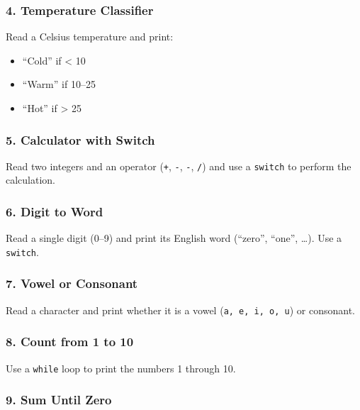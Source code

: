 \documentclass[
  letterpaper,
  DIV=11,
  numbers=noendperiod]{scrreprt}
\providecommand{\tightlist}{%
  \setlength{\itemsep}{0pt}\setlength{\parskip}{0pt}}
\begin{document}
\subsubsection{4. Temperature Classifier}\label{temperature-classifier}

Read a Celsius temperature and print:

\begin{itemize}
\tightlist
\item
  ``Cold'' if \textless{} 10
\item
  ``Warm'' if 10--25
\item
  ``Hot'' if \textgreater{} 25
\end{itemize}

\subsubsection{5. Calculator with Switch}\label{calculator-with-switch}

Read two integers and an operator (\texttt{+}, \texttt{-}, \texttt{-},
\texttt{/}) and use a \texttt{switch} to perform the calculation.

\subsubsection{6. Digit to Word}\label{digit-to-word}

Read a single digit (0--9) and print its English word (``zero'',
``one'', \ldots). Use a \texttt{switch}.

\subsubsection{7. Vowel or Consonant}\label{vowel-or-consonant}

Read a character and print whether it is a vowel
(\texttt{a,\ e,\ i,\ o,\ u}) or consonant.

\subsubsection{8. Count from 1 to 10}\label{count-from-1-to-10}

Use a \texttt{while} loop to print the numbers 1 through 10.

\subsubsection{9. Sum Until Zero}\label{sum-until-zero}
\end{document}
